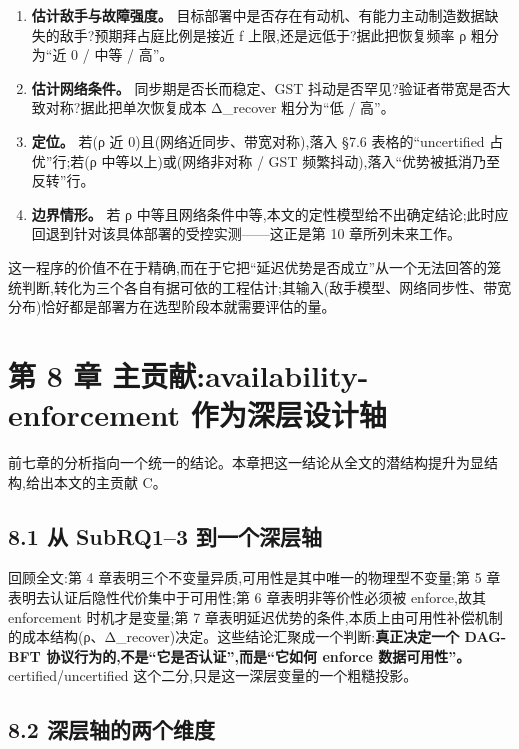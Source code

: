\documentclass[UTF8,fontset=windows,a4paper,11pt]{ctexart}
\providecommand{\tightlist}{\setlength{\itemsep}{0pt}\setlength{\parskip}{0pt}}
\begin{document}
\begin{enumerate}
\def\labelenumi{\arabic{enumi}.}
\tightlist
\item
  \textbf{估计敌手与故障强度。}
  目标部署中是否存在有动机、有能力主动制造数据缺失的敌手?预期拜占庭比例是接近
  f 上限,还是远低于?据此把恢复频率 ρ 粗分为``近 0 / 中等 / 高''。
\item
  \textbf{估计网络条件。} 同步期是否长而稳定、GST
  抖动是否罕见?验证者带宽是否大致对称?据此把单次恢复成本 Δ\_recover
  粗分为``低 / 高''。
\item
  \textbf{定位。} 若(ρ 近 0)且(网络近同步、带宽对称),落入 §7.6
  表格的``uncertified 占优''行;若(ρ 中等以上)或(网络非对称 / GST
  频繁抖动),落入``优势被抵消乃至反转''行。
\item
  \textbf{边界情形。} 若 ρ
  中等且网络条件中等,本文的定性模型给不出确定结论;此时应回退到针对该具体部署的受控实测------这正是第
  10 章所列未来工作。
\end{enumerate}

这一程序的价值不在于精确,而在于它把``延迟优势是否成立''从一个无法回答的笼统判断,转化为三个各自有据可依的工程估计;其输入(敌手模型、网络同步性、带宽分布)恰好都是部署方在选型阶段本就需要评估的量。

\section{第 8 章 主贡献:availability-enforcement
作为深层设计轴}\label{ux7b2c-8-ux7ae0-ux4e3bux8d21ux732eavailability-enforcement-ux4f5cux4e3aux6df1ux5c42ux8bbeux8ba1ux8f74}

前七章的分析指向一个统一的结论。本章把这一结论从全文的潜结构提升为显结构,给出本文的主贡献
C。

\subsection{8.1 从 SubRQ1--3
到一个深层轴}\label{ux4ece-subrq13-ux5230ux4e00ux4e2aux6df1ux5c42ux8f74}

回顾全文:第 4 章表明三个不变量异质,可用性是其中唯一的物理型不变量;第 5
章表明去认证后隐性代价集中于可用性;第 6 章表明非等价性必须被
enforce,故其 enforcement 时机才是变量;第 7
章表明延迟优势的条件,本质上由可用性补偿机制的成本结构(ρ、Δ\_recover)决定。这些结论汇聚成一个判断:\textbf{真正决定一个
DAG-BFT 协议行为的,不是``它是否认证'',而是``它如何 enforce
数据可用性''。} certified/uncertified
这个二分,只是这一深层变量的一个粗糙投影。

\subsection{8.2
深层轴的两个维度}\label{ux6df1ux5c42ux8f74ux7684ux4e24ux4e2aux7ef4ux5ea6}
\end{document}
